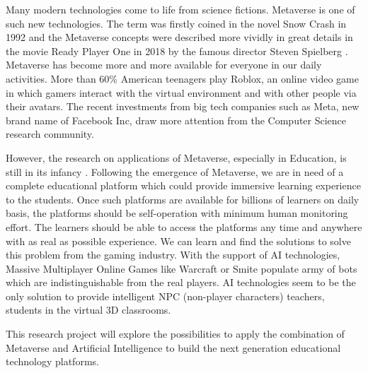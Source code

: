 \documentclass[
    ngerman,american
    ]{scrartcl}
\begin{document}
        \sectionIntroduction
        Many modern technologies come to life from science fictions. Metaverse is one of such new technologies. 
        The term was firstly coined in the novel Snow Crash in 1992 
        and the Metaverse concepts were described more vividly in great details in the movie Ready Player One 
        in 2018 by the famous director Steven Spielberg \cite{mystakidis_meta_encyclopedia_2022} \cite{park_meta_taxonomy_2022}. 
        Metaverse has become more and more available for everyone in our daily activities. More than 60\% American teenagers play Roblox, 
        an online video game in which gamers interact with the virtual environment and with other people via 
        their avatars. The recent investments from big tech companies such as Meta, new brand name of Facebook Inc, 
        draw more attention from the Computer Science research community.
        \par
        However, the research on applications of Metaverse, especially in Education, is still in its infancy 
        \cite{bokyung_meta_ed_2022} \cite{hwang_meta_ai_2022} \cite{tlili_metaed_2022}. Following 
        the emergence of Metaverse, we are in need of a complete educational platform which could provide immersive 
        learning experience to the students. Once such platforms are available for billions of learners on daily basis, the platforms 
        should be self-operation with minimum human monitoring effort. The learners should be able to access
        the platforms any time and anywhere with as real as possible experience. We can learn and find the solutions 
        to solve this problem from the gaming industry. With the support of AI technologies, Massive Multiplayer Online Games 
        like Warcraft or Smite populate army of bots which are indistinguishable from the real players.  AI technologies 
        seem to be the only solution to provide intelligent NPC (non-player characters) teachers, students in the virtual 3D classrooms.         
        \par
        This research project will explore the possibilities to apply the combination of Metaverse and Artificial Intelligence 
        to build the next generation educational technology platforms.                
        
                       
        \sectionImpact        
        
\end{document}
